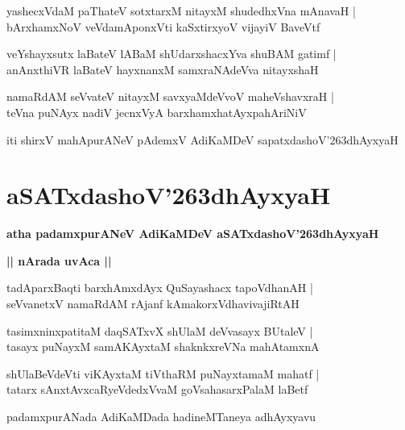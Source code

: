 \documentclass[twoside,12pt,openright]{book}
\def\S{\char'263}
\newcounter{shloka}[chapter]
\def\uvaca#1{\centerline{{\large\textbf{#1}}}}
\begin{document}
\begin{shloka}
yashecxVdaM paThateV sotxtarxM nitayxM shudedhxVna mAnavaH |\\
bArxhamxNoV veVdamAponxVti kaSxtirxyoV vijayiV BaveVtf 
\end{shloka}

\begin{shloka}
veYshayxsutx laBateV lABaM shUdarxshacxYva shuBAM gatimf |\\
anAnxthiVR laBateV hayxnanxM samxraNAdeVva nitayxshaH 
\end{shloka}

\begin{shloka}
namaRdAM seVvateV nitayxM savxyaMdeVvoV maheVshavxraH |\\
teVna puNAyx nadiV jecnxVyA barxhamxhatAyxpahAriNiV 
\end{shloka}

\begin{center}
iti shirxV mahApurANeV pAdemxV AdiKaMDeV sapatxdashoV\S dhAyxyaH
\end{center}

\chapter{aSATxdashoV\S dhAyxyaH}

\begin{center}
{\LARGE\bfseries atha padamxpurANeV AdiKaMDeV aSATxdashoV\S dhAyxyaH}
\end{center}

\uvaca{|| nArada uvAca ||}

\begin{shloka}
tadAparxBaqti barxhAmxdAyx QuSayashacx tapoVdhanAH |\\
seVvanetxV namaRdAM rAjanf kAmakorxVdhavivajiRtAH 
\end{shloka}

\begin{shloka}
tasimxninxpatitaM daqSATxvX shUlaM deVvasayx BUtaleV |\\
tasayx puNayxM samAKAyxtaM shaknkxreVNa mahAtamxnA 
\end{shloka}

\begin{shloka}
shUlaBeVdeVti viKAyxtaM tiVthaRM puNayxtamaM mahatf |\\
tatarx sAnxtAvxcaRyeVdedxVvaM goVsahasarxPalaM laBetf
\end{shloka}

\begin{center}
padamxpurANada AdiKaMDada hadineMTaneya adhAyxyavu
\end{center}
\end{document}
